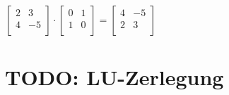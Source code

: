 \documentclass[../main.tex]{subfiles}
\begin{document}
$\begin{bmatrix}
    2 & 3 \\
    4 & -5 \\
\end{bmatrix} \cdot
\begin{bmatrix}
    0 & 1 \\
    1 & 0 \\
\end{bmatrix} = 
\begin{bmatrix}
    4 & -5 \\
    2 & 3 \\
\end{bmatrix}$

\section{TODO: LU-Zerlegung}
\end{document}
